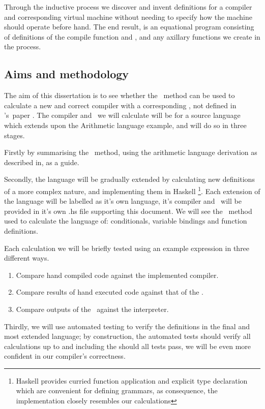\documentclass {article}
\begin{document}
Through the inductive process we discover 
and invent definitions
for a compiler and corresponding virtual machine 
without needing to specify how the 
machine should operate before hand.
The end result, is an equational program consisting of
definitions of the compile function and \vm,
and any axillary functions we create in the process.

\subsection{Aims and methodology}

The aim of this dissertation is to
see whether the \BH\ method can
be used to calculate a new and correct compiler
with a corresponding \vm, 
not defined in \BH's\ paper \cite{bandh}.
The compiler and \vm\ we will calculate 
will be for a source language which extends 
upon the Arithmetic language example\cite[Section 2]{bandh},
and will do so in three stages.

Firstly by summarising the \BH\ method,
using the arithmetic language derivation 
as described in, as a guide.

Secondly, the language will be gradually extended
by calculating new definitions of a more complex nature,
and implementing them in Haskell
\footnote{Haskell provides curried function application
		and explicit type declaration which are
		convenient for defining grammars,
		as consequence, the implementation closely
		resembles our calculations}.
Each extension of the language will be labelled 
as it's own language, it's compiler and \vm\ 
will be provided in it's own .hs file supporting
this document.
We will see the \BH\ method used to calculate
the language of: conditionals, variable bindings
and function definitions.

Each calculation we will be briefly tested
using an example expression
in three different ways.

\begin{enumerate}
	\item Compare hand compiled code against the
		implemented compiler.
	\item Compare results of hand executed code 
		against that of the \vm.
	\item Compare outputs of the \vm\ against the interpreter.
\end{enumerate}

Thirdly, we will use automated testing
to verify the definitions in the final
and most extended language; 
by construction, the automated
tests should verify all calculations up
to and including the 
should all tests pass, we will
be even more confident in our 
compiler's correctness.
\end{document}
